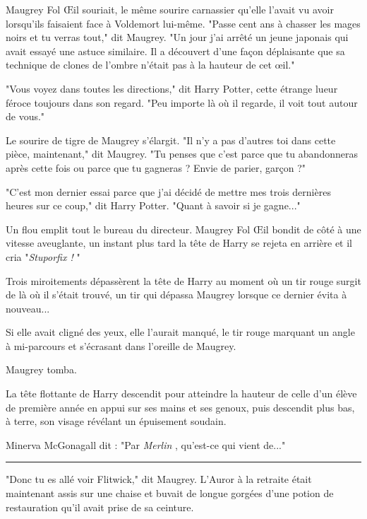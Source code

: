 Maugrey Fol Œil souriait, le même sourire carnassier qu'elle l'avait vu avoir lorsqu'ils faisaient face à Voldemort lui-même. "Passe cent ans à chasser les mages noirs et tu verras tout," dit Maugrey. "Un jour j'ai arrêté un jeune japonais qui avait essayé une astuce similaire. Il a découvert d'une façon déplaisante que sa technique de clones de l'ombre n'était pas à la hauteur de cet œil."

"Vous voyez dans toutes les directions," dit Harry Potter, cette étrange lueur féroce toujours dans son regard. "Peu importe là où il regarde, il voit tout autour de vous."

Le sourire de tigre de Maugrey s'élargit. "Il n'y a pas d'autres toi dans cette pièce, maintenant," dit Maugrey. "Tu penses que c'est parce que tu abandonneras après cette fois ou parce que tu gagneras ? Envie de parier, garçon ?"

"C'est mon dernier essai parce que j'ai décidé de mettre mes trois dernières heures sur ce coup," dit Harry Potter. "Quant à savoir si je gagne..."

Un flou emplit tout le bureau du directeur. Maugrey Fol Œil bondit de côté à une vitesse aveuglante, un instant plus tard la tête de Harry se rejeta en arrière et il cria "\emph{Stuporfix !} "

Trois miroitements dépassèrent la tête de Harry au moment où un tir rouge surgit de là où il s'était trouvé, un tir qui dépassa Maugrey lorsque ce dernier évita à nouveau...

Si elle avait cligné des yeux, elle l'aurait manqué, le tir rouge marquant un angle à mi-parcours et s'écrasant dans l'oreille de Maugrey.

Maugrey tomba.

La tête flottante de Harry descendit pour atteindre la hauteur de celle d'un élève de première année en appui sur ses mains et ses genoux, puis descendit plus bas, à terre, son visage révélant un épuisement soudain.

Minerva McGonagall dit : "Par \emph{Merlin} , qu'est-ce qui vient de..."
\par\noindent\rule{\textwidth}{0.4pt}
"Donc tu es allé voir Flitwick," dit Maugrey. L'Auror à la retraite était maintenant assis sur une chaise et buvait de longue gorgées d'une potion de restauration qu'il avait prise de sa ceinture.

